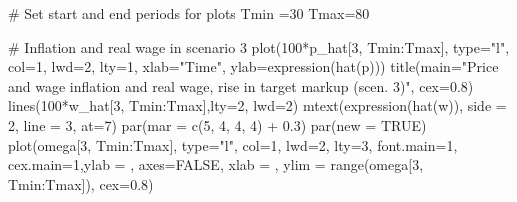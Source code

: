 \documentclass[
  letterpaper,
  DIV=11,
  numbers=noendperiod]{scrreprt}
\newenvironment{Shaded}{\begin{snugshade}}{\end{snugshade}}
\newcommand{\AttributeTok}[1]{\textcolor[rgb]{0.40,0.45,0.13}{#1}}
\newcommand{\CommentTok}[1]{\textcolor[rgb]{0.37,0.37,0.37}{#1}}
\newcommand{\ConstantTok}[1]{\textcolor[rgb]{0.56,0.35,0.01}{#1}}
\newcommand{\DecValTok}[1]{\textcolor[rgb]{0.68,0.00,0.00}{#1}}
\newcommand{\FloatTok}[1]{\textcolor[rgb]{0.68,0.00,0.00}{#1}}
\newcommand{\FunctionTok}[1]{\textcolor[rgb]{0.28,0.35,0.67}{#1}}
\newcommand{\NormalTok}[1]{\textcolor[rgb]{0.00,0.23,0.31}{#1}}
\newcommand{\OtherTok}[1]{\textcolor[rgb]{0.00,0.23,0.31}{#1}}
\newcommand{\SpecialCharTok}[1]{\textcolor[rgb]{0.37,0.37,0.37}{#1}}
\newcommand{\StringTok}[1]{\textcolor[rgb]{0.13,0.47,0.30}{#1}}
\begin{document}
\begin{Shaded}
\begin{Highlighting}[]
\CommentTok{\# Set start and end periods for plots}
\NormalTok{Tmin }\OtherTok{=}\DecValTok{30}
\NormalTok{Tmax}\OtherTok{=}\DecValTok{80}

\CommentTok{\# Inflation and real wage in scenario 3}
\FunctionTok{plot}\NormalTok{(}\DecValTok{100}\SpecialCharTok{*}\NormalTok{p\_hat[}\DecValTok{3}\NormalTok{, Tmin}\SpecialCharTok{:}\NormalTok{Tmax], }\AttributeTok{type=}\StringTok{"l"}\NormalTok{, }\AttributeTok{col=}\DecValTok{1}\NormalTok{, }\AttributeTok{lwd=}\DecValTok{2}\NormalTok{, }\AttributeTok{lty=}\DecValTok{1}\NormalTok{, }\AttributeTok{xlab=}\StringTok{"Time"}\NormalTok{, }\AttributeTok{ylab=}\FunctionTok{expression}\NormalTok{(}\FunctionTok{hat}\NormalTok{(p))) }
\FunctionTok{title}\NormalTok{(}\AttributeTok{main=}\StringTok{"Price and wage inflation and real wage, rise in target markup (scen. 3)"}\NormalTok{, }\AttributeTok{cex=}\FloatTok{0.8}\NormalTok{)}
\FunctionTok{lines}\NormalTok{(}\DecValTok{100}\SpecialCharTok{*}\NormalTok{w\_hat[}\DecValTok{3}\NormalTok{, Tmin}\SpecialCharTok{:}\NormalTok{Tmax],}\AttributeTok{lty=}\DecValTok{2}\NormalTok{, }\AttributeTok{lwd=}\DecValTok{2}\NormalTok{)}
\FunctionTok{mtext}\NormalTok{(}\FunctionTok{expression}\NormalTok{(}\FunctionTok{hat}\NormalTok{(w)), }\AttributeTok{side =} \DecValTok{2}\NormalTok{, }\AttributeTok{line =} \DecValTok{3}\NormalTok{, }\AttributeTok{at=}\DecValTok{7}\NormalTok{)}
\FunctionTok{par}\NormalTok{(}\AttributeTok{mar =} \FunctionTok{c}\NormalTok{(}\DecValTok{5}\NormalTok{, }\DecValTok{4}\NormalTok{, }\DecValTok{4}\NormalTok{, }\DecValTok{4}\NormalTok{) }\SpecialCharTok{+} \FloatTok{0.3}\NormalTok{)}
\FunctionTok{par}\NormalTok{(}\AttributeTok{new =} \ConstantTok{TRUE}\NormalTok{)}
\FunctionTok{plot}\NormalTok{(omega[}\DecValTok{3}\NormalTok{, Tmin}\SpecialCharTok{:}\NormalTok{Tmax], }\AttributeTok{type=}\StringTok{"l"}\NormalTok{, }\AttributeTok{col=}\DecValTok{1}\NormalTok{, }\AttributeTok{lwd=}\DecValTok{2}\NormalTok{, }\AttributeTok{lty=}\DecValTok{3}\NormalTok{, }\AttributeTok{font.main=}\DecValTok{1}\NormalTok{, }\AttributeTok{cex.main=}\DecValTok{1}\NormalTok{,}\AttributeTok{ylab =} \StringTok{\textquotesingle{}\textquotesingle{}}\NormalTok{, }\AttributeTok{axes=}\ConstantTok{FALSE}\NormalTok{,}
     \AttributeTok{xlab =} \StringTok{\textquotesingle{}\textquotesingle{}}\NormalTok{, }\AttributeTok{ylim =} \FunctionTok{range}\NormalTok{(omega[}\DecValTok{3}\NormalTok{, Tmin}\SpecialCharTok{:}\NormalTok{Tmax]), }\AttributeTok{cex=}\FloatTok{0.8}\NormalTok{)}

\end{Highlighting}
\end{Shaded}
\end{document}
